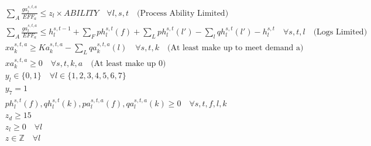 \documentclass[fleqn,10pt]{wlscirep}
\begin{document}
\begin{align}
    & \sum_A \frac{ga_{l}^{s, t, a}}{EFF_a} \leq z_{l} \times ABILITY \quad \forall l, s, t \quad \text{(Process Ability Limited)} \\
    & \sum_A \frac{ga_{l}^{s, t, a}}{EFF_a} \leq h_{l}^{s, t-1} + \sum_{F} ph_{l}^{s, t}(f) + \sum_{L} ph_{l}^{s, t}(l') - \sum_{l} qh_{l}^{s, t}(l') - h_{l}^{s, t} \quad \forall s, t, l \quad \text{(Logs Limited)} \\
    & xa_{k}^{s, t, a} \geq Ka_{k}^{s, t, a} - \sum_{L} qa_{k}^{s, t, a}(l) \quad \forall s, t, k \quad \text{(At least make up to meet demand a)} \\
    & xa_{k}^{s, t, a} \geq 0 \quad \forall s, t, k, a \quad \text{(At least make up 0)} \\
    & y_l \in \{0, 1\} \quad \forall l \in \{1, 2, 3, 4, 5, 6, 7 \} \\
    & y_{7} = 1 \\
    & ph_{l}^{s, t}(f), qh_{l}^{s, t}(k), pa_{l}^{s, t, a}(f), qa_{l}^{s, t, a}(k) \geq 0 \quad \forall s, t, f, l, k \\
    & z_{d} \geq 15 \\
    & z_{l} \geq 0 \quad \forall l \\
    & z \in \mathbb{Z} \quad \forall l
\end{align}
\end{document}
